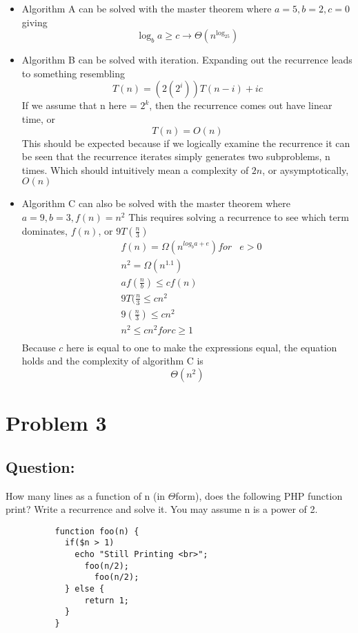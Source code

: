 \documentclass[12pt]{article}
\begin{document}
      \begin{itemize} 
        \item 
            Algorithm A can be solved with the master theorem where $a = 5, b = 2, c = 0$ giving $$\log_ba \ge c \rightarrow \Theta(n^{\log_25})$$
        \item
            Algorithm B can be solved with iteration. Expanding out the recurrence leads to something resembling
            $$T(n) = (2(2^i))T(n-i) + ic$$
            If we assume that n here = $2^k$, then the recurrence comes out have linear time, or 
            $$T(n) = O(n)$$
            This should be expected because if we logically examine the recurrence it can be seen that the recurrence iterates simply generates two subproblems, n times. Which should intuitively mean a complexity of $2n$, or aysymptotically, $O(n)$
        \item 
            Algorithm C can also be solved with the master theorem where $a = 9, b = 3, f(n) = n^2$ This requires solving a recurrence to see which term dominates, $f(n)$, or $9T(\frac{n}{3})$ 
          \begin{equation}
            \begin{aligned} 
              & f(n) = \Omega(n^{log_ba + e}) for & e > 0 \\
              & n^2 = \Omega(n^{1.1}) \\
              & af(\frac{n}{b}) \le cf(n) \\
              & 9T(\frac{n}{3} \le cn^2 \\
              & 9(\frac{n}{3}) \le cn^2 \\
              & n^2 \le cn^2 for c \ge 1 \\
            \end{aligned}
          \end{equation}
            Because $c$ here is equal to one to make the expressions equal, the equation holds and the complexity of algorithm C is $$\Theta(n^2)$$
      \end{itemize}

\pagebreak

\section{Problem 3}

      \subsection{Question:}
        How many lines as a function of n (in $\Theta$form), does the following PHP function print? Write a recurrence and solve it. You may assume n is a power of 2. 
        \begin{verbatim}
          function foo(n) { 
            if($n > 1) 
              echo "Still Printing <br>"; 
                foo(n/2); 
                  foo(n/2); 
            } else {  
                return 1; 
            }
          } 
        \end{verbatim}
\end{document}
